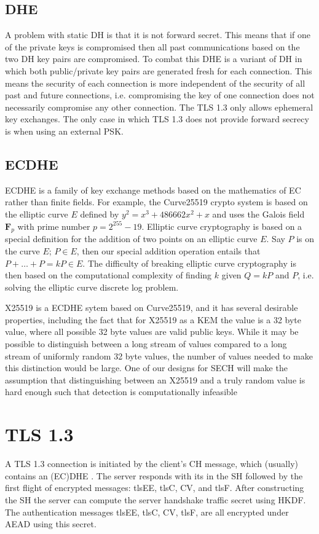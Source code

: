 \subsection{DHE}
A problem with static \ac{DH} is that it is not forward secret. This means
that if one of the private keys is compromised then all past communications
based on the two \ac{DH} key pairs are compromised.
To combat this \ac{DHE} is a variant of \ac{DH} in which both public/private key pairs
are generated fresh for each connection. This means the security of each connection is more independent of the security of all past and future connections, i.e. compromising
the key of one connection does not necessarily compromise any other connection.
The \ac{TLS} 1.3 only allows ephemeral key exchanges. The only case in which \ac{TLS} 1.3 does not provide forward secrecy is when using an external \ac{PSK}.

\subsection{ECDHE}
\ac{EC}\ac{DHE} is a family of key exchange methods based on the mathematics of \ac{EC}
rather than finite fields.
For example, the Curve25519 crypto system is based on the elliptic curve $E$ defined by
$y^2=x^3+486662x^2+x$ and uses the Galois field $\mathbf{F}_p$ with prime number $p=2^{255}-19$.
Elliptic curve cryptography is based on a special definition for the addition
of two points on an elliptic curve $E$.
Say $P$ is on the curve $E$; $P\in E$,
then our special addition operation entails that $P+\ldots+P=kP\in E$. 
The difficulty of breaking elliptic curve cryptography is then based on
the computational complexity of finding $k$ given $Q=kP$ and $P$,
i.e. solving the elliptic curve discrete log problem.

\ac{X25519} is a \ac{EC}\ac{DHE} sytem based on Curve25519,
and it has several desirable properties,
including the fact that for \ac{X25519} as a \ac{KEM} the  value
is a 32 byte value,
where all possible 32 byte values are valid public keys.
While it may be possible to distinguish between a long stream of  values compared to a long stream of uniformly random 32 byte values,
the number of values needed to make this distinction would be large.
One of our designs for \ac{SECH} will make the assumption that
distinguishing between an \ac{X25519}  and a truly random
value is hard enough such that detection is computationally infeasible

\section{TLS 1.3}
A \ac{TLS} 1.3 connection is initiated by the client's \ac{CH} message, which (usually)
contains an (\ac{EC})\ac{DHE} .
The server responds with its  in the \ac{SH} followed by the first flight of encrypted messages: \ac{tlsEE}, \ac{tlsC}, \ac{CV}, and \ac{tlsF}.
After constructing the \ac{SH} the server can compute the server handshake traffic secret using \ac{HKDF}. The authentication messages \ac{tlsEE}, \ac{tlsC}, \ac{CV}, \ac{tlsF}, are all encrypted under \ac{AEAD} using this secret.

